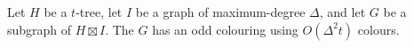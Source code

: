 \documentclass{patmorin}
\begin{document}
\begin{thm}\label{new_result_delta}
  Let $H$ be a $t$-tree, let $I$ be a graph of maximum-degree $\Delta$, and let $G$ be a subgraph of $H\boxtimes I$.  The $G$ has an odd colouring using $O(\Delta^2 t)$ colours.
\end{thm}



%
%
%



\end{document}
